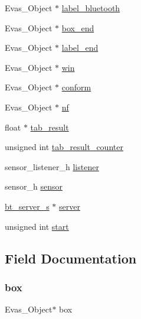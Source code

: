 \begin{DoxyCompactItemize}
Evas\+\_\+\+Object $\ast$ \hyperlink{structappdata_a02943b4ddef11369f2c9d662e2f390d4}{label\+\_\+bluetooth}
\item 
Evas\+\_\+\+Object $\ast$ \hyperlink{structappdata_af1dc6b9c0b61a43e5aaea2b2a0082fee}{box\+\_\+end}
\item 
Evas\+\_\+\+Object $\ast$ \hyperlink{structappdata_a66dda86ae1327ec51b68b18e1c218b75}{label\+\_\+end}
\item 
Evas\+\_\+\+Object $\ast$ \hyperlink{structappdata_a588367fdb1ab298a0018bea36186a29a}{win}
\item 
Evas\+\_\+\+Object $\ast$ \hyperlink{structappdata_a9eb99245082e7dba12cf177857df50e5}{conform}
\item 
Evas\+\_\+\+Object $\ast$ \hyperlink{structappdata_aedeb1845dc6e9e538005fafa1be7129b}{nf}
\item 
float $\ast$ \hyperlink{structappdata_a0fabaff8dc45fd6a24f7d371f11a3c6b}{tab\+\_\+result}
\item 
unsigned int \hyperlink{structappdata_aa91889b8d2b34d5f2e55fa5b0b570b28}{tab\+\_\+result\+\_\+counter}
\item 
sensor\+\_\+listener\+\_\+h \hyperlink{structappdata_aa977dfb866b24fd7d9a20a9a01b2fd1f}{listener}
\item 
sensor\+\_\+h \hyperlink{structappdata_a5bae9b7801bc3808411925cde81d3f26}{sensor}
\item 
\hyperlink{dataextraction_8h_a1dfcda4d0742bb4e7823fb169181e647}{bt\+\_\+server\+\_\+s} $\ast$ \hyperlink{structappdata_a006fc931907500c0ed40d920b050aec6}{server}
\item 
unsigned int \hyperlink{structappdata_a885b350339beb75f5940572b641aaa58}{start}
\end{DoxyCompactItemize}


\subsection{Field Documentation}
\mbox{\label{structappdata_af1800da6589f3b33b93f082cba17d237}} 
\subsubsection{\texorpdfstring{box}{box}}
{\footnotesize\ttfamily Evas\+\_\+\+Object$\ast$ box}

\mbox{\label{structappdata_ab645fa09eb1fe55ae0bf9f610428bdf2}} 

